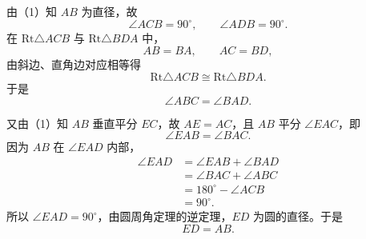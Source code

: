 \begin{answer}
由（1）知 $AB$ 为直径，故
\nopagebreak[4]
\[\angle ACB=90^\circ,\qquad \angle ADB=90^\circ.\]
在 $\mathrm{Rt}\triangle ACB$ 与 $\mathrm{Rt}\triangle BDA$ 中，
\nopagebreak[4]
\[AB=BA,\qquad AC=BD,\]
由斜边、直角边对应相等得
\nopagebreak[4]
\[\mathrm{Rt}\triangle ACB\cong\mathrm{Rt}\triangle BDA.\]
于是
\nopagebreak[4]
\[\angle ABC=\angle BAD.\]

又由（1）知 $AB$ 垂直平分 $EC$，故 $AE=AC$，且 $AB$ 平分 $\angle EAC$，即
\nopagebreak[4]
\[\angle EAB=\angle BAC.\]
因为 $AB$ 在 $\angle EAD$ 内部，
\nopagebreak[4]
\[\begin{aligned}
\angle EAD
&=\angle EAB+\angle BAD\\
&=\angle BAC+\angle ABC\\
&=180^\circ-\angle ACB\\
&=90^\circ.
\end{aligned}\]
所以 $\angle EAD=90^\circ$，由圆周角定理的逆定理，$ED$ 为圆的直径。于是
\nopagebreak[4]
\[ED=AB.\]



\end{answer}
